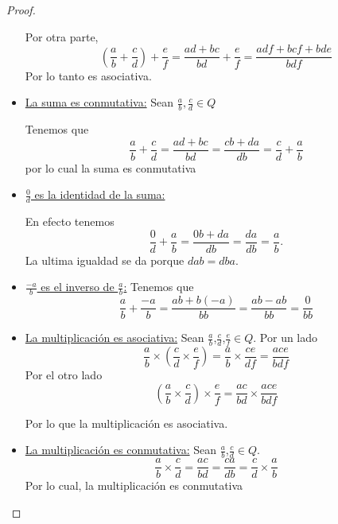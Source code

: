 \documentclass[letter,twoside,12pt]{article}
\begin{document}
\begin{proof}
\begin{itemize}
Por otra parte,
\begin{equation}
(\frac{a}{b}+\frac{c}{d})+\frac{e}{f}=\frac{ad+bc}{bd}+\frac{e}{f}=\frac{adf+bcf+bde}{bdf} \nonumber
\end{equation}
Por lo tanto es asociativa.
\item \underline{La suma es conmutativa:} Sean $ \frac{a}{b}, \frac{c}{d} \in Q$

Tenemos que
\begin{equation}
\frac{a}{b}+\frac{c}{d}=\frac{ad+bc}{bd}=\frac{cb+da}{db}=\frac{c}{d}+\frac{a}{b} \nonumber
\end{equation}
por lo cual la suma es conmutativa

\item \underline{$\frac{0}{d}$ es la identidad de la suma:}

En efecto tenemos
\begin{equation}
\frac{0}{d}+\frac{a}{b}=\frac{0b+da}{db}=\frac{da}{db}=\frac{a}{b}. \nonumber
\end{equation}
La ultima igualdad se da porque $ dab=dba $.

\item \underline{$ \frac{-a}{b} $ es el inverso de $ \frac{a}{b} $:}
Tenemos que 
\begin{equation}
\frac{a}{b}+\frac{-a}{b}=\frac{ab+b(-a)}{bb}=\frac{ab-ab}{bb}=\frac{0}{bb} \nonumber
\end{equation}

\item \underline{La multiplicaci\'on es asociativa:} Sean $ \frac{a}{b} $,$ \frac{c}{d} $,$ \frac{e}{f} \in Q$. Por un lado
\begin{equation}
\frac{a}{b} \times (\frac{c}{d} \times \frac{e}{f}) = \frac{a}{b}\times \frac{ce}{df} = \frac{ace}{bdf} \nonumber
\end{equation}
Por el otro lado 
\begin{equation}
(\frac{a}{b} \times \frac{c}{d}) \times \frac{e}{f} = \frac{ac}{bd} \times \frac{ace}{bdf} \nonumber
\end{equation}

Por lo que la multiplicaci\'on es asociativa.

\item \underline{La multiplicaci\'on es conmutativa:} Sean $ \frac{a}{b} $,$ \frac{c}{d} \in Q $.
\begin{equation}
\frac{a}{b}\times \frac{c}{d} = \frac{ac}{bd} = \frac{ca}{db}=\frac{c}{d}\times \frac{a}{b} \nonumber
\end{equation}
Por lo cual, la multiplicaci\'on es conmutativa


\end{itemize}
\end{proof}
\end{document}

